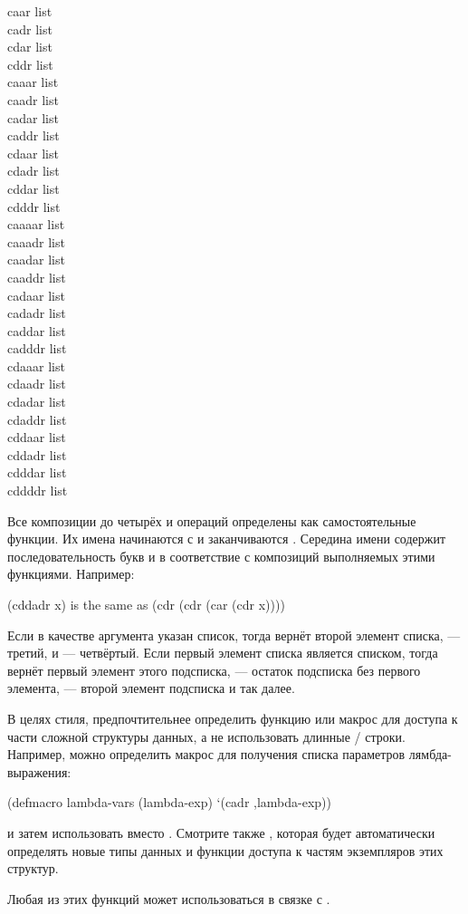 \begin{defun}[Функция]
caar list \\
cadr list \\
cdar list \\
cddr list \\
caaar list \\
caadr list \\
cadar list \\
caddr list \\
cdaar list \\
cdadr list \\
cddar list \\
cdddr list \\
caaaar list \\
caaadr list \\
caadar list \\
caaddr list \\
cadaar list \\
cadadr list \\
caddar list \\
cadddr list \\
cdaaar list \\
cdaadr list \\
cdadar list \\
cdaddr list \\
cddaar list \\
cddadr list \\
cdddar list \\
cddddr list

Все композиции до четырёх  и  операций определены как
самостоятельные функции.
Их имена начинаются с  и заканчиваются . Середина имени содержит
последовательность букв  и  в соответствие с композиций выполняемых
этими функциями.
Например:
\begin{lisp}
(cddadr x) \textrm{is the same as} (cdr (cdr (car (cdr x))))
\end{lisp}
Если в качестве аргумента указан список, тогда  вернёт второй элемент
списка,  --- третий, и  --- четвёртый. Если первый
элемент списка является списком, тогда  вернёт первый элемент этого
подсписка,  --- остаток подсписка без первого элемента,  --- второй
элемент подсписка и так далее.

В целях стиля, предпочтительнее определить функцию или макрос для
доступа к части сложной структуры данных, а не использовать длинные
/ строки. Например, можно определить макрос для получения
списка параметров лямбда-выражения:
\begin{lisp}
(defmacro lambda-vars (lambda-exp) `(cadr ,lambda-exp))
\end{lisp}
и затем использовать  вместо .
Смотрите также , которая будет автоматически определять новые
типы данных и функции доступа к частям экземпляров этих структур.

Любая из этих функций может использоваться в связке с .
\end{defun}
	
